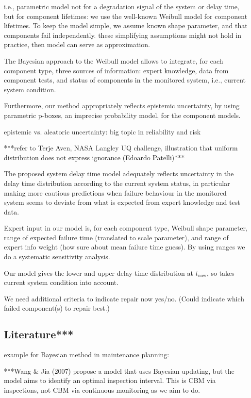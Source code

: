 \documentclass[authoryear]{elsarticle}
\def\tnow{t_\text{now}}
\begin{document}
i.e., parametric model not for a degradation signal of the system or delay time, but for component lifetimes:
we use the well-known Weibull model for component lifetimes.
To keep the model simple, we assume known shape parameter,
and that components fail independently.
these simplifying assumptions might not hold in practice,
then model can serve as approximation.

The Bayesian approach to the Weibull model allows to integrate, for each component type,
three sources of information: expert knowledge, data from component tests,
and status of components in the monitored system, i.e., current system condition.

Furthermore, our method appropriately reflects epistemic uncertainty,
by using parametric p-boxes, an imprecise probability model, for the component models.

epistemic vs. aleatoric uncertainty: big topic in reliability and risk

***refer to Terje Aven, NASA Langley UQ challenge, illustration that uniform distribution does not express ignorance (Edoardo Patelli)***

The proposed system delay time model adequately reflects uncertainty in the delay time distribution
according to the current system status,
in particular making more cautious predictions when failure behaviour in the monitored system
seems to deviate from what is expected from expert knowledge and test data.

Expert input in our model is, for each component type,
Weibull shape parameter, range of expected failure time (translated to scale parameter),
and range of expert info weight (how sure about mean failure time guess).
By using ranges we do a systematic sensitivity analysis.

Our model gives the lower and upper delay time distribution at $\tnow$,
so takes current system condition into account.

We need additional criteria to indicate repair now yes/no.
(Could indicate which failed component(s) to repair best.)


\subsection{Literature***}

example for Bayesian method in maintenance planning: \cite{2007:wang-jia}

***Wang \& Jia (2007) propose a model that uses Bayesian updating,
but the model aims to identify an optimal inspection interval.
This is CBM via inspections, not CBM via continuous monitoring as we aim to do.
\end{document}
